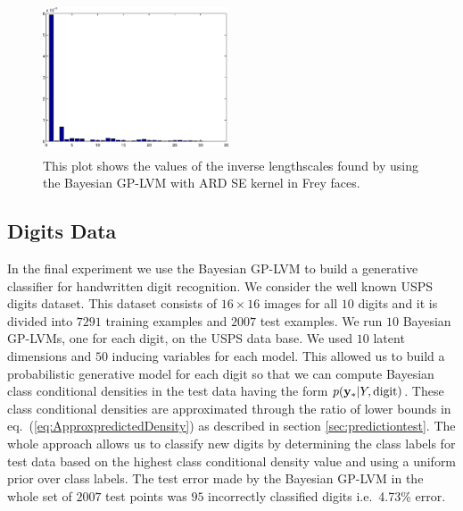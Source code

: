 \documentclass[twoside,times]{article}
\begin{document}
\begin{figure}[ht]
\begin{center}
\includegraphics[width=55mm,height=45mm]
{../diagrams/demBrendanVargplvmLengthScales3.eps}
\caption{This plot shows the values of the inverse lengthscales
found by using the Bayesian GP-LVM with ARD SE kernel in Frey faces.  
\label{fig:BrendanInverseLenghScale}}
\end{center}
\end{figure}


\vspace{-6mm}
\subsection{Digits Data}
\vspace{-2mm}

In the final experiment we use the Bayesian GP-LVM to build a
generative classifier for handwritten digit recognition. We consider
the well known USPS digits dataset. This dataset consists of $16
\times 16$ images for all $10$ digits and it is divided into $7291$
training examples and $2007$ test examples.  We run $10$ Bayesian
GP-LVMs, one for each digit, on the USPS data base. We used $10$
latent dimensions and $50$ inducing variables for each model. This
allowed us to build a probabilistic generative model for each digit so
that we can compute Bayesian class conditional densities in the test
data having the form $p(\mathbf{y}_*|Y,\text{digit})$. These class
conditional densities are approximated through the ratio of lower
bounds in eq.\ (\ref{eq:ApproxpredictedDensity}) as described in
section \ref{sec:predictiontest}.  The whole approach allows us to
classify new digits by determining the class labels for test data
based on the highest class conditional density value and using a
uniform prior over class labels.  The test error made by the Bayesian
GP-LVM in the whole set of $2007$ test points was $95$ incorrectly
classified digits i.e.\ 4.73\% error. 
\end{document}
